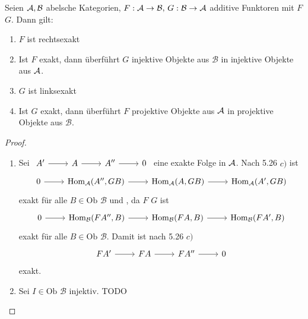 \begin{sa}
	Seien $\mathcal{A}, \mathcal{B}$ abelsche Kategorien, $F:\mathcal{A} \to \mathcal{B}, \, G: \mathcal{B} \to \mathcal{A}$ additive Funktoren mit $F$  $G$. Dann gilt:
	\begin{enumerate}[label= \alph*)]
		\item $F$ ist rechtsexakt
		\item Ist $F$ exakt, dann überführt $G$ injektive Objekte aus $\mathcal{B}$ in injektive Objekte aus $\mathcal{A}$.
		\item $G$ ist linksexakt
		\item Ist $G$ exakt, dann überführt $F$ projektive Objekte aus $\mathcal{A}$ in projektive Objekte aus $\mathcal{B}$.
	\end{enumerate}
\end{sa}
\begin{proof}
	\begin{enumerate}[label= \alph*)]
		\item Sei $\begin{tikzcd}
		A' \arrow{r} & A \arrow{r} & A'' \arrow{r} & 0
		\end{tikzcd}$ eine exakte Folge in $\mathcal{A}$. Nach 5.26 $c)$ ist 
			$$\begin{tikzcd}
		0 \arrow{r}& \Hom_\A(A'', GB) \arrow{r} & \Hom_\A(A,GB) \arrow{r} & \Hom_\A(A',GB)
		\end{tikzcd}$$
		exakt für alle $B\in \text{Ob }\mathcal{B}$ und , da $F$   $G$ ist
		$$\begin{tikzcd}
		0 \arrow{r}& \Hom_\mathcal{B}(FA'', B) \arrow{r} & \Hom_\mathcal{B}(FA,B) \arrow{r} & \Hom_\mathcal{B}(FA',B)
		\end{tikzcd}$$
		exakt für alle $B\in \text{Ob }\mathcal{B}$. Damit ist nach 5.26 $c)$
		$$\begin{tikzcd}
		FA' \arrow{r} & FA \arrow{r} & FA'' \arrow{r} & 0
		\end{tikzcd}$$
		exakt.
		\item Sei $I\in \text{Ob } \mathcal{B}$ injektiv.
		 TODO
	\end{enumerate}
\end{proof}